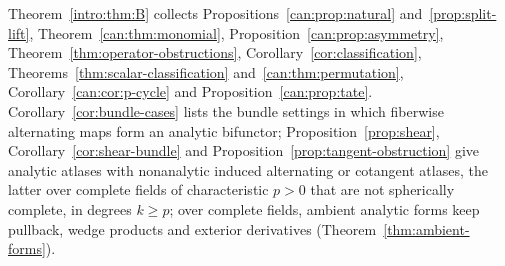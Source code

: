\documentclass[11pt]{amsart}
\theoremstyle{definition}
\theoremstyle{remark}
\numberwithin{equation}{section}
\theoremstyle{plain}
\theoremstyle{definition}
\theoremstyle{plain}
\begin{document}
Theorem~\ref{intro:thm:B} collects Propositions~\ref{can:prop:natural} and~\ref{prop:split-lift},
Theorem~\ref{can:thm:monomial}, Proposition~\ref{can:prop:asymmetry}, Theorem~\ref{thm:operator-obstructions},
Corollary~\ref{cor:classification}, Theorems~\ref{thm:scalar-classification} and~\ref{can:thm:permutation},
Corollary~\ref{can:cor:p-cycle} and Proposition~\ref{can:prop:tate}. Corollary~\ref{cor:bundle-cases} lists the bundle
settings in which fiberwise alternating maps form an analytic bifunctor; Proposition~\ref{prop:shear},
Corollary~\ref{cor:shear-bundle} and Proposition~\ref{prop:tangent-obstruction} give analytic atlases with nonanalytic
induced alternating or cotangent atlases, the latter over complete fields of characteristic $p>0$ that are not
spherically complete, in degrees $k\ge p$; over complete fields, ambient analytic forms keep pullback, wedge products
and exterior derivatives (Theorem~\ref{thm:ambient-forms}).
\end{document}
